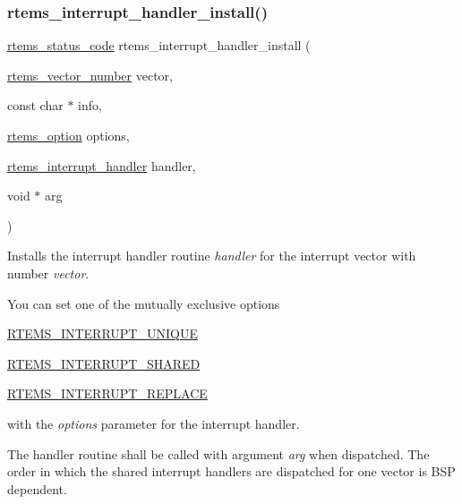 \subsubsection{\texorpdfstring{rtems\_interrupt\_handler\_install()}{rtems\_interrupt\_handler\_install()}}
{\footnotesize\ttfamily \mbox{\hyperlink{group__ClassicStatus_ga545d41846817eaba6143d52ee4d9e9fe}{rtems\+\_\+status\+\_\+code}} rtems\+\_\+interrupt\+\_\+handler\+\_\+install (\begin{DoxyParamCaption}\item[{\mbox{\hyperlink{group__ClassicINTR_ga3e434c197d99f128e78cae4d9358bd8b}{rtems\+\_\+vector\+\_\+number}}}]{vector,  }\item[{const char $\ast$}]{info,  }\item[{\mbox{\hyperlink{group__ClassicOptions_gad26685eb0e60a9650082935c31920e29}{rtems\+\_\+option}}}]{options,  }\item[{\mbox{\hyperlink{group__rtems__interrupt__extension_gab39bd096ab2c3b41d03dace0e9777b08}{rtems\+\_\+interrupt\+\_\+handler}}}]{handler,  }\item[{void $\ast$}]{arg }\end{DoxyParamCaption})}



Installs the interrupt handler routine {\itshape handler} for the interrupt vector with number {\itshape vector}. 

You can set one of the mutually exclusive options


\begin{DoxyItemize}
\item \mbox{\hyperlink{group__rtems__interrupt__extension_ga5f61e9433b266894801af5ed9992efac}{R\+T\+E\+M\+S\+\_\+\+I\+N\+T\+E\+R\+R\+U\+P\+T\+\_\+\+U\+N\+I\+Q\+UE}}
\item \mbox{\hyperlink{group__rtems__interrupt__extension_ga4ef5d96798d52439c7836596650f7d98}{R\+T\+E\+M\+S\+\_\+\+I\+N\+T\+E\+R\+R\+U\+P\+T\+\_\+\+S\+H\+A\+R\+ED}}
\item \mbox{\hyperlink{group__rtems__interrupt__extension_gaca2eb7f8caa5eda72bd6924ee4c8e5d3}{R\+T\+E\+M\+S\+\_\+\+I\+N\+T\+E\+R\+R\+U\+P\+T\+\_\+\+R\+E\+P\+L\+A\+CE}}
\end{DoxyItemize}

with the {\itshape options} parameter for the interrupt handler.

The handler routine shall be called with argument {\itshape arg} when dispatched. The order in which the shared interrupt handlers are dispatched for one vector is B\+SP dependent.

